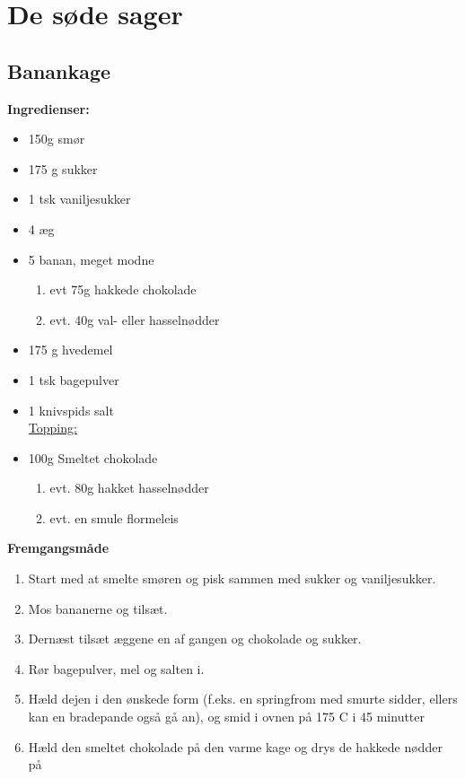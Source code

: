 \documentclass{book}
\begin{document}
\chapter{De søde sager}
\minitoc
\newpage\section{Banankage}
\begin{minipage}[t]{0.6\textwidth}
\textbf{Ingredienser:}
\begin{itemize}
  \item 150g smør
  \item 175 g sukker
  \item 1 tsk vaniljesukker
  \item 4 æg
  \item 5 banan, meget modne
  \begin{enumerate}
    \item evt 75g hakkede chokolade
    \item evt. 40g val- eller hasselnødder
  \end{enumerate}
  \item  175 g hvedemel
   \item1  tsk bagepulver
   \item 1 knivspids salt 
\\ \underline{Topping:}
 \item 100g Smeltet chokolade
\begin{enumerate}
    \item evt. 80g hakket hasselnødder
    \item evt. en smule flormeleis
\end{enumerate} 
\end{itemize}
\end{minipage}
\begin{minipage}[t]{0.4\textwidth}
\textbf{Fremgangsmåde}
\begin{enumerate}
   \item  Start med at smelte smøren og pisk sammen med sukker og vaniljesukker. 
   \item  Mos bananerne og tilsæt.
   \item  Dernæst tilsæt æggene en af gangen og chokolade og sukker.
   \item  Rør bagepulver, mel og salten i.
   \item  Hæld dejen i den ønskede form (f.eks. en springfrom med smurte sidder, ellers kan en bradepande også gå an), og smid i ovnen på 175 \degree C i 45 minutter
   \item  Hæld den smeltet chokolade på den varme kage og drys de hakkede nødder på 
\end{enumerate}
\end{minipage}
\end{document}
